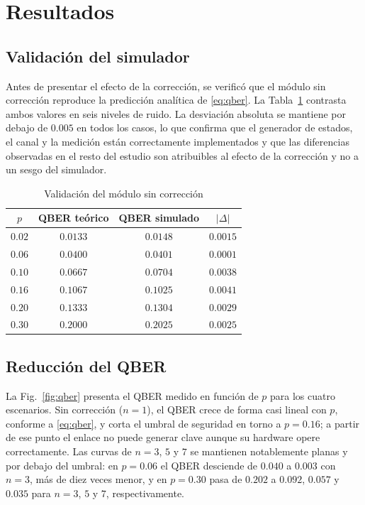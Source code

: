 \documentclass[conference]{IEEEtran}
\begin{document}
\section{Resultados}
\label{sec:resultados}

\subsection{Validación del simulador}

Antes de presentar el efecto de la corrección, se verificó que el módulo sin
corrección reproduce la predicción analítica de \eqref{eq:qber}. La
Tabla~\ref{tab:validacion} contrasta ambos valores en seis niveles de ruido. La
desviación absoluta se mantiene por debajo de $0.005$ en todos los casos, lo que
confirma que el generador de estados, el canal y la medición están correctamente
implementados y que las diferencias observadas en el resto del estudio son
atribuibles al efecto de la corrección y no a un sesgo del simulador.

\begin{table}[!t]
\renewcommand{\arraystretch}{1.15}
\caption{Validación del módulo sin corrección}
\label{tab:validacion}
\centering
\begin{tabular}{@{}cccc@{}}
\toprule
$p$ & QBER teórico & QBER simulado & $|\Delta|$ \\
\midrule
$0.02$ & $0.0133$ & $0.0148$ & $0.0015$ \\
$0.06$ & $0.0400$ & $0.0401$ & $0.0001$ \\
$0.10$ & $0.0667$ & $0.0704$ & $0.0038$ \\
$0.16$ & $0.1067$ & $0.1025$ & $0.0041$ \\
$0.20$ & $0.1333$ & $0.1304$ & $0.0029$ \\
$0.30$ & $0.2000$ & $0.2025$ & $0.0025$ \\
\bottomrule
\end{tabular}
\end{table}

\subsection{Reducción del QBER}

La Fig.~\ref{fig:qber} presenta el QBER medido en función de $p$ para los cuatro
escenarios. Sin corrección ($n=1$), el QBER crece de forma casi lineal con $p$,
conforme a \eqref{eq:qber}, y corta el umbral de seguridad en torno a
$p=0.16$; a partir de ese punto el enlace no puede generar clave aunque su
hardware opere correctamente. Las curvas de $n=3$, $5$ y $7$ se mantienen
notablemente planas y por debajo del umbral: en $p=0.06$ el QBER desciende de
$0.040$ a $0.003$ con $n=3$, más de diez veces menor, y en $p=0.30$ pasa de
$0.202$ a $0.092$, $0.057$ y $0.035$ para $n=3$, $5$ y $7$, respectivamente.
\end{document}
